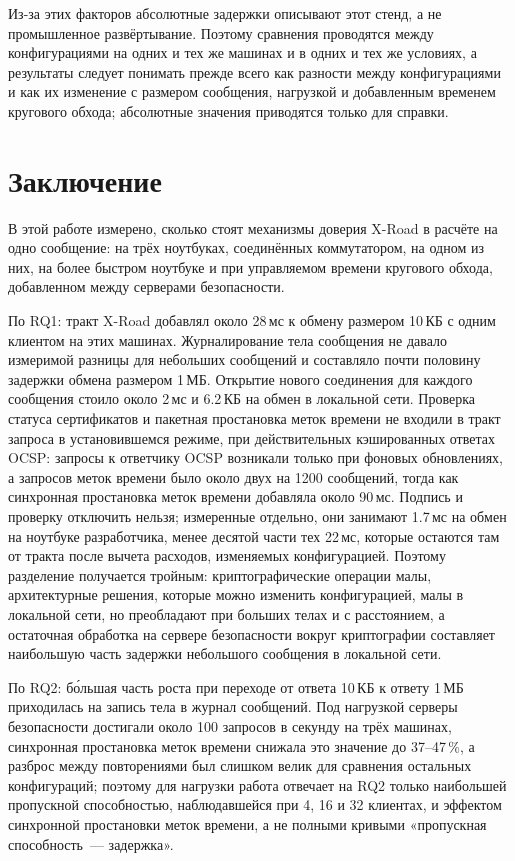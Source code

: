 \documentclass[conference,a4paper]{IEEEtran}
\newcommand{\newtext}[1]{{\color{blue}#1}}
\newcommand{\newred}[1]{{\color{red}#1}}
\begin{document}
Из-за этих факторов абсолютные задержки описывают этот стенд, а не промышленное
развёртывание. Поэтому сравнения проводятся между конфигурациями на одних и тех же машинах и
в одних и тех же условиях, а результаты следует понимать прежде всего как разности между конфигурациями
и как их изменение с размером сообщения, нагрузкой и добавленным временем кругового обхода; абсолютные значения приводятся
только для справки.

\section{Заключение}

В этой работе измерено, сколько стоят механизмы доверия X-Road в расчёте на одно сообщение: на трёх ноутбуках,
соединённых коммутатором, на одном из них, на более быстром ноутбуке и при управляемом времени кругового обхода,
добавленном между серверами безопасности.

По RQ1: тракт X-Road добавлял около 28\,мс к обмену размером 10\,КБ с одним клиентом на этих машинах.
Журналирование тела сообщения не давало измеримой разницы для небольших сообщений и составляло почти
половину задержки обмена размером 1\,МБ. Открытие нового соединения для каждого сообщения стоило около 2\,мс
и 6.2\,КБ на обмен в локальной сети. Проверка статуса сертификатов и пакетная простановка меток времени
не входили в тракт запроса \newred{в установившемся режиме, при действительных кэшированных ответах OCSP}: запросы к ответчику OCSP возникали только при фоновых обновлениях, а запросов меток времени было около двух
на 1200 сообщений,
тогда как синхронная простановка меток времени добавляла около 90\,мс. Подпись и проверку отключить нельзя;
\newtext{измеренные отдельно, они занимают 1.7\,мс на обмен на ноутбуке разработчика, менее
десятой части тех 22\,мс, которые остаются там от тракта после вычета расходов, изменяемых
конфигурацией. Поэтому разделение получается тройным: криптографические операции малы,
архитектурные решения, которые можно изменить конфигурацией, малы в локальной сети, но преобладают
при больших телах и с расстоянием, а \newred{остаточная обработка} на сервере безопасности вокруг
криптографии составляет наибольшую часть задержки небольшого сообщения в локальной сети.}

По RQ2: б\'{о}льшая часть роста при переходе от ответа 10\,КБ к ответу 1\,МБ приходилась на запись тела в
журнал сообщений. Под нагрузкой серверы безопасности достигали около 100 запросов в секунду на трёх машинах,
синхронная простановка меток времени \newtext{снижала это значение до 37--47\,\%}, а разброс между повторениями был слишком велик для сравнения
остальных конфигураций\newred{; поэтому для нагрузки работа отвечает на RQ2 только наибольшей
пропускной способностью, наблюдавшейся при 4, 16 и 32 клиентах, и эффектом синхронной простановки меток времени, а не
полными кривыми «пропускная способность~--- задержка»}.
\end{document}
